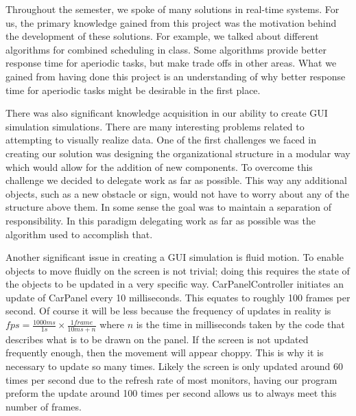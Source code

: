\documentclass{article} %
\begin{document}
Throughout the semester, we spoke of many solutions in real-time systems.
For us, the primary knowledge gained from this project was the motivation behind the development of these solutions.
For example, we talked about different algorithms for combined scheduling in class. Some algorithms provide better response time for aperiodic tasks, but
make trade offs in other areas.
What we gained from having done this project is an understanding of why better response time for aperiodic tasks might be desirable in the first place. 

There was also significant knowledge acquisition in our ability to create GUI simulation simulations.
There are many interesting problems related to attempting to visually realize data.
One of the first challenges we faced in creating our solution was designing the organizational structure in a modular way which would allow for the addition of new components.
To overcome this challenge we decided to delegate work as far as possible.
This way any additional objects, such as a new obstacle or sign, would not have to worry about any of the structure above them.
In some sense the goal was to maintain a separation of responsibility. In this paradigm delegating work as far as possible was the algorithm used to accomplish that.

Another significant issue in creating a GUI simulation is fluid motion.
To enable objects to move fluidly on the screen is not trivial; doing this requires the state of the objects to be updated in a very specific way.
CarPanelController initiates an update of CarPanel every 10 milliseconds. This equates to roughly 100 frames per second. Of course it will be less because the frequency of updates in reality is $fps = \frac{1000 ms}{1 s} \times \frac{1 frame}{10ms + n}$ where $n$ is the time in milliseconds taken by the code that describes what is to be drawn on the panel.
If the screen is not updated frequently enough, then the movement will appear choppy.
This is why it is necessary to update so many times. Likely the screen is only updated around 60 times per second due to the refresh rate of most monitors, having our program preform the update around 100 times per second allows us to always meet this number of frames.
\end{document}
